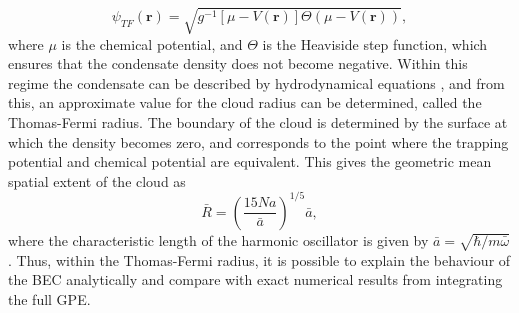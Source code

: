 \begin{equation}
\psi_{TF}(\textbf{r}) = \sqrt{ g^{-1}[\mu - V(\textbf{r})] \Theta(\mu - V(\textbf{r}))},
\end{equation}
where $\mu$ is the chemical potential, and $\Theta$ is the Heaviside step function, which ensures that the condensate density does not become negative. Within this regime the condensate can be described by hydrodynamical equations \cite[Pg.~180]{BK:Pitaevskii_Stringari_2003}, and from this, an approximate value for the cloud radius can be determined, called the Thomas-Fermi radius. The boundary of the cloud is determined by the surface at which the density becomes zero, and corresponds to the point where the trapping potential and chemical potential are equivalent. This gives the geometric mean spatial extent of the cloud \cite[~p. 169]{BK:Pethick_Smith_2008} as
\begin{equation}
\bar{R} = \left(\frac{15Na}{\bar{a}}\right)^{1/5}\bar{a},
\end{equation}
where the characteristic length of the harmonic oscillator is given by
$\bar{a} = \sqrt{{\hbar}/{m\bar{\omega}}}$. Thus, within the Thomas-Fermi radius, it is possible to explain the behaviour of the BEC analytically and compare with exact numerical results from integrating the full GPE.

